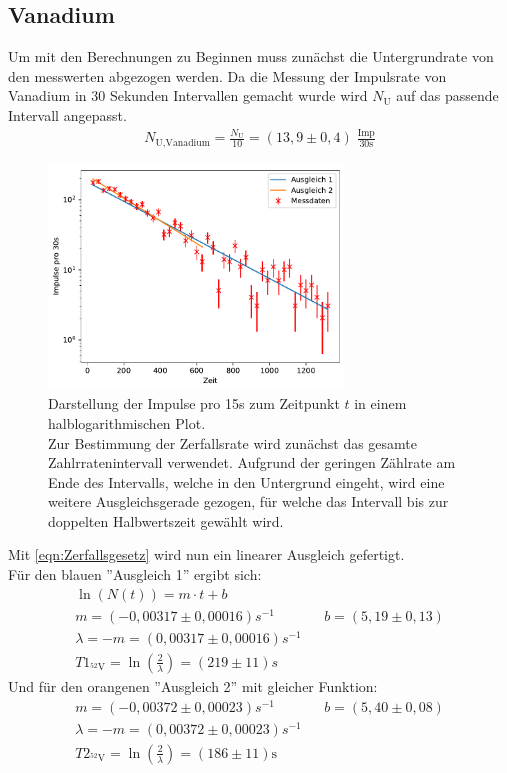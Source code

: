\subsection{Vanadium}
Um mit den Berechnungen zu Beginnen muss zunächst die Untergrundrate von den messwerten abgezogen werden.
Da die Messung der Impulsrate von Vanadium in 30 Sekunden Intervallen gemacht wurde wird $N_{\text{U}}$ auf das passende Intervall angepasst.
\begin{align*}
    N_{\text{U},\text{Vanadium}} =  \frac{N_{\text{U}}}{10} = (13,9 \pm 0,4) \; \frac{\text{Imp}}{30\text{s}}
\end{align*}
\begin{figure}
    \centering
    \includegraphics[width=0.7\textwidth]{plots/Vanadium.pdf}
    \caption{Darstellung der Impulse pro 15s zum Zeitpunkt $t$ in einem halblogarithmischen Plot.\\
    Zur Bestimmung der Zerfallsrate wird zunächst das gesamte Zahlrratenintervall verwendet. 
    Aufgrund der geringen Zählrate am Ende des Intervalls, welche in den Untergrund eingeht, wird eine
    weitere Ausgleichsgerade gezogen, für welche das Intervall bis zur doppelten Halbwertszeit gewählt wird. }
\end{figure}
Mit \ref{eqn:Zerfallsgesetz} wird nun ein linearer Ausgleich gefertigt. \\
Für den blauen ''Ausgleich 1'' ergibt sich:
\begin{align*}
    \ln(N(t)) = m \cdot t + b\\
     m = (-0,00317 \pm 0,00016)\si{s^{-1}} && b = (5,19 \pm 0,13) \\
    \lambda = -m = (0,00317 \pm 0,00016)\si{s^{-1}} \\
    T1_{^{52}\text{V}} = \ln\left( \frac{2}{\lambda} \right) = (219 \pm 11) \si{s}
\end{align*}
Und für den orangenen ''Ausgleich 2'' mit gleicher Funktion:
\begin{align*}
     m = (-0,00372 \pm 0,00023)\si{s^{-1}} && b = (5,40 \pm 0,08) \\
    \lambda = -m = (0,00372 \pm 0,00023)\si{s^{-1}} \\
    T2_{^{52}\text{V}} = \ln\left( \frac{2}{\lambda} \right) = (186 \pm 11) \text{s}
\end{align*}

